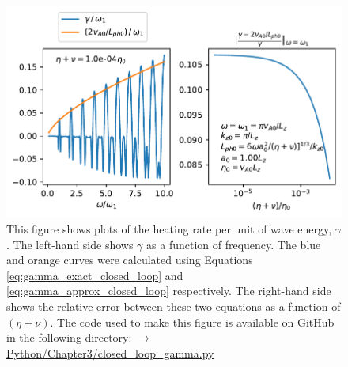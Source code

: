 \begin{figure}
    \vspace{-20pt}
    \centering
    \includegraphics[width=\textwidth,height=0.85\textheight,keepaspectratio]{figures/chapter03/closed_loop_gamma.pdf}
    \vspace{-30pt}
    \caption{This figure shows plots of the heating rate per unit of wave energy, $\gamma$. The left-hand side shows $\gamma$ as a function of frequency. The blue and orange curves were calculated using Equations \eqref{eq:gamma_exact_closed_loop} and \eqref{eq:gamma_approx_closed_loop} respectively. The right-hand side shows the relative error between these two equations as a function of $(\eta+\nu)$. The code used to make this figure is available on GitHub in the following directory:\newline
    \href{https://github.com/aleksyprok/apkp_thesis/blob/main/Python/Chapter3/closed_loop_gamma.py}{$\rightarrow$ Python/Chapter3/closed\_loop\_gamma.py}}
    \label{fig:closed_loop_gamma}
    \vspace{-10pt}
\end{figure}

